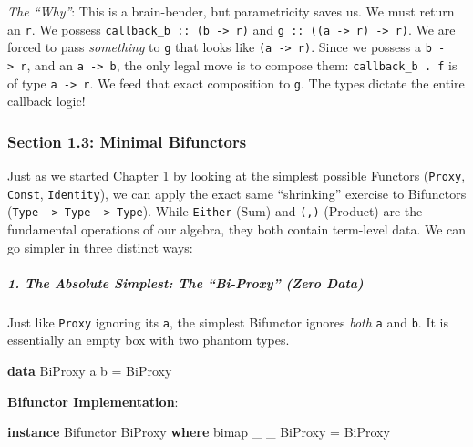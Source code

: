 \documentclass[
]{article}
\newenvironment{Shaded}{}{}
\newcommand{\DataTypeTok}[1]{\textcolor[rgb]{0.56,0.13,0.00}{#1}}
\newcommand{\KeywordTok}[1]{\textcolor[rgb]{0.00,0.44,0.13}{\textbf{#1}}}
\newcommand{\NormalTok}[1]{#1}
\newcommand{\OtherTok}[1]{\textcolor[rgb]{0.00,0.44,0.13}{#1}}
\begin{document}
\begin{itemize}
  \emph{The ``Why''}: This is a brain-bender, but parametricity saves
  us. We must return an \texttt{r}. We possess
  \texttt{callback\_b\ ::\ (b\ -\textgreater{}\ r)} and
  \texttt{g\ ::\ ((a\ -\textgreater{}\ r)\ -\textgreater{}\ r)}. We are
  forced to pass \emph{something} to \texttt{g} that looks like
  \texttt{(a\ -\textgreater{}\ r)}. Since we possess a
  \texttt{b\ -\textgreater{}\ r}, and an \texttt{a\ -\textgreater{}\ b},
  the only legal move is to compose them: \texttt{callback\_b\ .\ f} is
  of type \texttt{a\ -\textgreater{}\ r}. We feed that exact composition
  to \texttt{g}. The types dictate the entire callback logic!
\end{itemize}

\subsubsection{Section 1.3: Minimal
Bifunctors}\label{section-1.3-minimal-bifunctors}

Just as we started Chapter 1 by looking at the simplest possible
Functors (\texttt{Proxy}, \texttt{Const}, \texttt{Identity}), we can
apply the exact same ``shrinking'' exercise to Bifunctors
(\texttt{Type\ -\textgreater{}\ Type\ -\textgreater{}\ Type}). While
\texttt{Either} (Sum) and \texttt{(,)} (Product) are the fundamental
operations of our algebra, they both contain term-level data. We can go
simpler in three distinct ways:

\subparagraph{1. The Absolute Simplest: The ``Bi-Proxy'' (Zero
Data)}\label{the-absolute-simplest-the-bi-proxy-zero-data}

Just like \texttt{Proxy} ignoring its \texttt{a}, the simplest Bifunctor
ignores \emph{both} \texttt{a} and \texttt{b}. It is essentially an
empty box with two phantom types.

\begin{Shaded}
\begin{Highlighting}[]
\KeywordTok{data} \DataTypeTok{BiProxy}\NormalTok{ a b }\OtherTok{=} \DataTypeTok{BiProxy}
\end{Highlighting}
\end{Shaded}

\textbf{Bifunctor Implementation}:

\begin{Shaded}
\begin{Highlighting}[]
\KeywordTok{instance} \DataTypeTok{Bifunctor} \DataTypeTok{BiProxy} \KeywordTok{where}
\NormalTok{    bimap \_ \_ }\DataTypeTok{BiProxy} \OtherTok{=} \DataTypeTok{BiProxy}
\end{Highlighting}
\end{Shaded}
\end{document}
